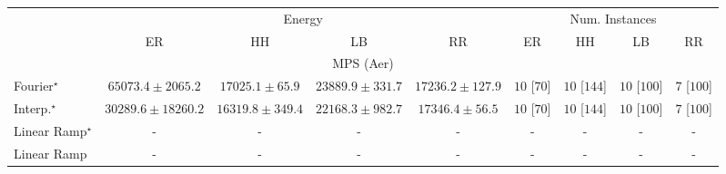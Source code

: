 \begin{tabular}{l|cccc|cccc|}
\toprule
& \multicolumn{4}{c|}{Energy} & \multicolumn{4}{c|}{Num. Instances} \\
            & ER & HH & LB & RR & ER & HH & LB & RR \\
\midrule
\multicolumn{9}{c}{\rule{0pt}{8pt}MPS (Aer)} \\
\midrule
Fourier$^\star$ & {\cellcolor[HTML]{81127E}} \color[HTML]{F1F1F1} $65073.4\pm 2065.2$ & {\cellcolor[HTML]{EFF6FA}} \color[HTML]{000000} $17025.1\pm 65.9$ & {\cellcolor[HTML]{D7E5F0}} \color[HTML]{000000} $23889.9\pm 331.7$ & {\cellcolor[HTML]{EEF6FA}} \color[HTML]{000000} $17236.2\pm 127.9$ & {\cellcolor[HTML]{49006A}} \color[HTML]{F1F1F1} $10$ [$70$] & {\cellcolor[HTML]{49006A}} \color[HTML]{F1F1F1} $10$ [$144$] & {\cellcolor[HTML]{49006A}} \color[HTML]{F1F1F1} $10$ [$100$] & {\cellcolor[HTML]{CD238F}} \color[HTML]{F1F1F1} $7$ [$100$] \\
Interp.$^\star$ & {\cellcolor[HTML]{BACFE4}} \color[HTML]{000000} $30289.6\pm 18260.2$ & {\cellcolor[HTML]{F1F8FB}} \color[HTML]{000000} $16319.8\pm 349.4$ & {\cellcolor[HTML]{DFEBF4}} \color[HTML]{000000} $22168.3\pm 982.7$ & {\cellcolor[HTML]{EEF6FA}} \color[HTML]{000000} $17346.4\pm 56.5$ & {\cellcolor[HTML]{49006A}} \color[HTML]{F1F1F1} $10$ [$70$] & {\cellcolor[HTML]{49006A}} \color[HTML]{F1F1F1} $10$ [$144$] & {\cellcolor[HTML]{49006A}} \color[HTML]{F1F1F1} $10$ [$100$] & {\cellcolor[HTML]{CD238F}} \color[HTML]{F1F1F1} $7$ [$100$] \\
Linear Ramp$^\star$ & {\cellcolor[HTML]{000000}} \color[HTML]{F1F1F1} {\cellcolor{white}} \color{black} - & {\cellcolor[HTML]{000000}} \color[HTML]{F1F1F1} {\cellcolor{white}} \color{black} - & {\cellcolor[HTML]{000000}} \color[HTML]{F1F1F1} {\cellcolor{white}} \color{black} - & {\cellcolor[HTML]{000000}} \color[HTML]{F1F1F1} {\cellcolor{white}} \color{black} - & {\cellcolor[HTML]{000000}} \color[HTML]{F1F1F1} {\cellcolor{white}} \color{black} - & {\cellcolor[HTML]{000000}} \color[HTML]{F1F1F1} {\cellcolor{white}} \color{black} - & {\cellcolor[HTML]{000000}} \color[HTML]{F1F1F1} {\cellcolor{white}} \color{black} - & {\cellcolor[HTML]{000000}} \color[HTML]{F1F1F1} {\cellcolor{white}} \color{black} - \\
Linear Ramp & {\cellcolor[HTML]{000000}} \color[HTML]{F1F1F1} {\cellcolor{white}} \color{black} - & {\cellcolor[HTML]{000000}} \color[HTML]{F1F1F1} {\cellcolor{white}} \color{black} - & {\cellcolor[HTML]{000000}} \color[HTML]{F1F1F1} {\cellcolor{white}} \color{black} - & {\cellcolor[HTML]{000000}} \color[HTML]{F1F1F1} {\cellcolor{white}} \color{black} - & {\cellcolor[HTML]{000000}} \color[HTML]{F1F1F1} {\cellcolor{white}} \color{black} - & {\cellcolor[HTML]{000000}} \color[HTML]{F1F1F1} {\cellcolor{white}} \color{black} - & {\cellcolor[HTML]{000000}} \color[HTML]{F1F1F1} {\cellcolor{white}} \color{black} - & {\cellcolor[HTML]{000000}} \color[HTML]{F1F1F1} {\cellcolor{white}} \color{black} - \\

\end{tabular}
